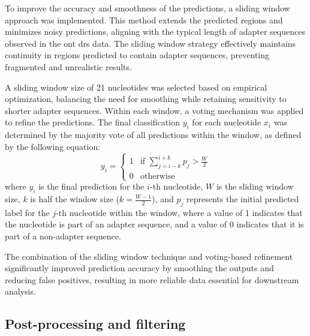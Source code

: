 \documentclass[pdflatex,sn-nature, lineno]{sn-jnl}%
\begin{document}
To improve the accuracy and smoothness of the predictions, a sliding window approach was implemented.
This method extends the predicted regions and minimizes noisy predictions, aligning with the typical length of adapter sequences observed in the \gls{ont} \gls{drs} data.
The sliding window strategy effectively maintains continuity in regions predicted to contain adapter sequences, preventing fragmented and unrealistic results.

A sliding window size of 21 nucleotides was selected based on empirical optimization, balancing the need for smoothing while retaining sensitivity to shorter adapter sequences.
Within each window, a voting mechanism was applied to refine the predictions.
The final classification $y_i$ for each nucleotide \( x_i \) was determined by the majority vote of all predictions within the window, as defined by the following equation:
\[
    y_i = \begin{cases}
        1 & \text{if } \sum_{j=i-k}^{i+k} p_j > \frac{W}{2} \\
        0 & \text{otherwise}
    \end{cases}
\]
where \(y_i\) is the final prediction for the $i$-th nucleotide, \( W \) is the sliding window size, \( k \) is half the window size (\( k = \frac{W-1}{2}\)), and  \(p_j\) represents the initial predicted label for the \(j\)-th nucleotide within the window, where a value of 1 indicates that the nucleotide is part of an adapter sequence, and a value of 0 indicates that it is part of a non-adapter sequence.

The combination of the sliding window technique and voting-based refinement significantly improved prediction accuracy by smoothing the outputs and reducing false positives, resulting in more reliable data essential for downstream analysis.

\subsection{Post-processing and filtering}
\end{document}
